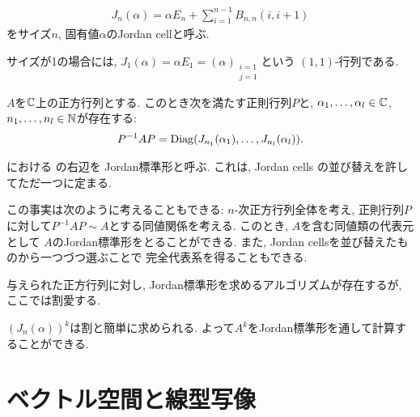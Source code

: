\begin{definition}
  \begin{align*}
    J_n(\alpha)=\alpha E_n+\sum_{i=1}^{n-1}B_{n,n}(i,i+1)
  \end{align*}
  をサイズ$n$, 固有値$\alpha$のJordan cellと呼ぶ.
\end{definition}
\begin{remark}
  サイズが1の場合には, $J_1(\alpha)=\alpha E_1 = (\alpha)_{\substack{i=1\\j=1}}$という
  $(1,1)$-行列である.
\end{remark}
\begin{theorem}
  \label{thm:jordan:decomp}
  $A$を$\mathbb{C}$上の正方行列とする.
  このとき次を満たす正則行列$P$と, $\alpha_1,\ldots,\alpha_l \in \mathbb{C}$,
  $n_1,\ldots, n_l\in\mathbb{N}$が存在する:
  \begin{align}
    P^{-1}AP=\operatorname{Diag}(J_{n_1}(\alpha_1),\ldots,J_{n_l}(\alpha_l)).
    \label{eq:jordan:decomp}
  \end{align}
\end{theorem}
\begin{remark}
  における
  の右辺を
  Jordan標準形と呼ぶ.
  これは,
  Jordan cells の並び替えを許してただ一つに定まる.

  この事実は次のように考えることもできる:
  $n$-次正方行列全体を考え,
  正則行列$P$に対して$P^{-1}AP\sim A$とする同値関係を考える.
  このとき,
  $A$を含む同値類の代表元として
  $A$のJordan標準形をとることができる.
  また,
  Jordan cellsを並び替えたものから一つづつ選ぶことで
  完全代表系を得ることもできる.
\end{remark}
\begin{remark}
  与えられた正方行列に対し,
  Jordan標準形を求めるアルゴリズムが存在するが,
  ここでは割愛する.
\end{remark}
\begin{remark}
  $(J_n(\alpha))^k$は割と簡単に求められる.
  よって$A^k$をJordan標準形を通して計算することができる.
\end{remark}

\section{ベクトル空間と線型写像}
